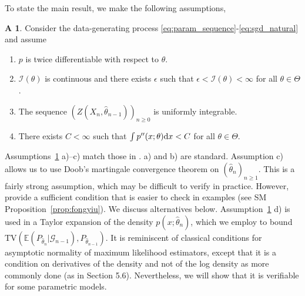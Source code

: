 \documentclass{article}
\theoremstyle{definition}
\newtheorem{assumption}{A}
\newcommand{\di}{{\rm d}}
\renewcommand{\&}{and}
\begin{document}
To state the main result, we make the following assumptions,

\begin{assumption}\label{ass:param_acid} Consider the data-generating process \eqref{eq:param_sequence}-\eqref{eq:sgd_natural} and assume
\begin{enumerate}[label=\alph*)]
\item  \hspace{0.2cm} $p$ is twice differentiable with respect to $\theta$.
\item \hspace{0.2cm} $\mathcal{I}(\theta)$ is continuous and there exists $\epsilon$ such that $\epsilon<\mathcal{I}(\theta)<\infty$ for all $\theta \in \Theta$. %
\item \hspace{0.2cm} The sequence $(Z(X_n,\hat{\theta}_{n-1}))_{n \geq 0}$ is uniformly integrable.
\item \hspace{0.2cm} There exists $C<\infty$ such that $\int p''(x;\theta) \di x <C$ for all $\theta \in \Theta$.
\end{enumerate}
\end{assumption}
Assumptions~\ref{ass:param_acid} a)–c) match those in \cite{fong2024asymptotics}.  a) and b) are standard. Assumption c) allows us to use Doob's martingale convergence theorem on $(\hat{\theta}_n)_{n \geq 1}$. This is a fairly strong assumption, which may be difficult to verify in practice. However, \cite{fong2024asymptotics} provide a sufficient condition that is easier to check in examples (see SM Proposition~\ref{prop:fongyiu}). We discuss alternatives below. Assumption~\ref{ass:param_acid} d) is used in a Taylor expansion of the density $p(x;\hat{\theta}_{n})$, which we employ to bound $\text{TV}(\mathbb{E}(P_{\hat{\theta}_{n}}|\mathcal{G}_{n-1}),P_{\hat{\theta}_{n-1}})$. It is reminiscent of classical conditions for asymptotic normality of maximum likelihood estimators, except that it is a condition on derivatives of the density and not of the log density as more commonly done (as in \cite{van2000asymptotic} Section 5.6). %
 Nevertheless, we will show that it is verifiable for some parametric models.
\end{document}
